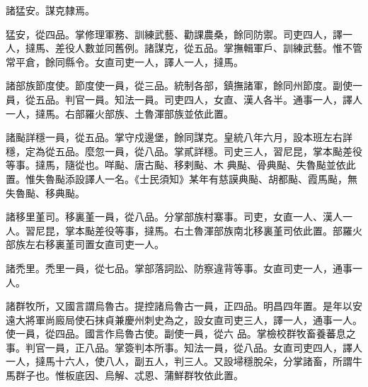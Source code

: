 \begin{pinyinscope}
 諸猛安。謀克隸焉。



 猛安，從四品。掌修理軍務、訓練武藝、勸課農桑，餘同防禦。司吏四人，譯一人，撻馬、差役人數並同舊例。諸謀克，從五品。掌撫輯軍戶、訓練武藝。惟不管常平倉，餘同縣令。女直司吏一人，譯人一人，撻馬。



 諸部族節度使。節度使一員，從三品。統制各部，鎮撫諸軍，餘同州節度。副使一員，從五品。判官一員。知法一員。司吏四人，女直、漢人各半。通事一人，譯人一人，撻馬。右部羅火部族、土魯渾部族並依此置。



 諸颭詳穩一員，從五品。掌守戍邊堡，餘同謀克。皇統八年六月，設本班左右詳穩，定為從五品。麼忽一員，從八品。掌貳詳穩。司史三人，習尼昆，掌本颭差役等事。撻馬，隨從也。咩颭、唐古颭、移剌颭、木
 典颭、骨典颭、失魯颭並依此置。惟失魯颭添設譯人一名。《士民須知》某年有慈謨典颭、胡都颭、霞馬颭，無失魯颭、移典颭。



 諸移里堇司。移裏堇一員，從八品。分掌部族村寨事。司吏，女直一人、漢人一人。習尼昆，掌本颭差役等事，撻馬。右土魯渾部族南北移裏堇司依此置。部羅火部族左右移裏堇司置女直司吏一人。



 諸禿里。禿里一員，從七品。掌部落詞訟、防察違背等事。女直司吏一人，通事一人。



 諸群牧所，又國言謂烏魯古。提控諸烏魯古一員，正四品。明昌四年置。是年以安遠大將軍尚廄局使石抹貞兼慶州刺史為之，設女直司吏三人，譯一人，通事一人。使一員，從四品。國言作烏魯古使。副使一員，從六
 品。掌檢校群牧畜養蕃息之事。判官一員，正八品。掌簽判本所事。知法一員，從八品。女直司吏四人，譯人一人，撻馬十六人，使八人，副五人，判三人。又設埽穩脫朵，分掌諸畜，所謂牛馬群子也。惟板底因、烏解、忒恩、蒲鮮群牧依此置。



\end{pinyinscope}